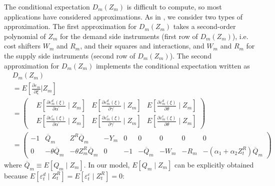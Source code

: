 \documentclass[11pt, a4paper]{article}
\begin{document}
The conditional expectation $D_{m}(Z_{m})$ is difficult to compute, so most applications have considered approximations. As in \cite{reynaert2014improving}, we consider two types of approximation. 
The first approximation for $D_{m}(Z_{m})$ takes a second-order polynomial of $Z_{m}$ for the demand side instruments (first row of $D_{m}(Z_{m})$), i.e. cost shifters $W_{m}$ and $R_{m}$, and their squares and interactions, and $W_{m}$ and $R_{m}$ for the supply side instruments (second row of $D_{m}(Z_{m})$).
The second approximation for $D_{m}(Z_{m})$ implements the conditional expectation written as 
\begin{align*}
    &D_{m}(Z_{m})\\
    &=E\left[\frac{\partial \varepsilon_{m}}{\partial \xi}| Z_{m}\right]\\
    &=
    \begin{pmatrix}
    & E\left[\frac{\partial \varepsilon_{m}^{d}(\xi)}{\partial \alpha^{\prime}} \mid Z_{m}\right] & 
    E\left[\frac{\partial \varepsilon_{m}^{d}(\xi)}{\partial \gamma^{\prime}} \mid Z_{m}\right] & 
    E\left[\frac{\partial \varepsilon_{m}^{d}(\xi)}{\partial \theta} \mid Z_{m}\right]\\
    & E\left[\frac{\partial \varepsilon_{m}^{c}(\xi)}{\partial \alpha^{\prime}} \mid Z_{m}\right] & 
    E\left[\frac{\partial \varepsilon_{m}^{c}(\xi)}{\partial \gamma^{\prime}} \mid Z_{m}\right] & 
    E\left[\frac{\partial \varepsilon_{m}^{c}(\xi)}{\partial \theta} \mid Z_{m}\right]
    \end{pmatrix} \\
    &=\begin{pmatrix}
    -1 & 
    \overline{Q}_{m} & 
    Z^{R} \overline{Q}_{m} & 
    - Y_{m} &
    0 & 0 & 0 & 0 & 0 \\
    0 &- \theta \overline{Q}_{m} & -\theta Z^{R}_{m}\overline{Q}_{m} & 0 & 
    -1 &
    - \overline{Q}_{m} &
    -W_{m} &
    -R_{m} &
    -(\alpha_1 + \alpha_2 Z^{R}_{t})\overline{Q}_{m}
    \end{pmatrix}
\end{align*}
where $ \overline{Q}_{m} \equiv E[Q_{m}\mid Z_{m}]$.
In our model, $E[Q_{m}\mid Z_{m}]$ can be explicitly obtained because $E[\varepsilon_{t}^{d}\mid Z_{t}^{R}] = E[\varepsilon_{t}^{c}\mid Z_{t}^{R}] = 0 $:
\end{document}
